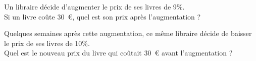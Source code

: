 \begin{myenumerate}
\item Un libraire décide d'augmenter le prix de ses livres de 9\%.\\Si
  un livre coûte 30~\textgreek{\euro}, quel est son prix après
  l'augmentation ?
\item Quelques semaines après cette augmentation, ce même libraire
  décide de baisser le prix de ses livres de 10\%.\\Quel est le
  nouveau prix du livre qui coûtait 30~\textgreek{\euro} avant
  l'augmentation ?
\end{myenumerate}